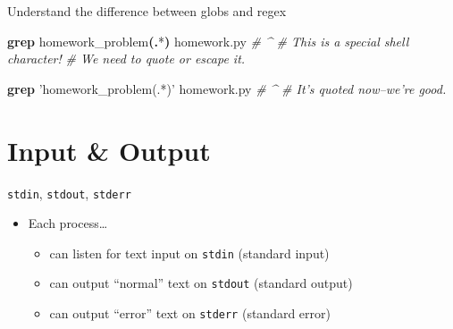 \documentclass[ignorenonframetext,]{beamer}
\newenvironment{Shaded}{}{}
\newcommand{\KeywordTok}[1]{\textcolor[rgb]{0.00,0.44,0.13}{\textbf{{#1}}}}
\newcommand{\StringTok}[1]{\textcolor[rgb]{0.25,0.44,0.63}{{#1}}}
\newcommand{\CommentTok}[1]{\textcolor[rgb]{0.38,0.63,0.69}{\textit{{#1}}}}
\newcommand{\NormalTok}[1]{{#1}}
\providecommand{\tightlist}{%
  \setlength{\itemsep}{0pt}\setlength{\parskip}{0pt}}
\begin{document}
\begin{frame}[fragile]{Understand the difference between globs and
regex}

\begin{Shaded}
\begin{Highlighting}[]
\KeywordTok{grep} \NormalTok{homework_problem}\KeywordTok{(.}\NormalTok{*}\KeywordTok{)} \NormalTok{homework.py}
\CommentTok{#                      ^}
\CommentTok{# This is a special shell character!}
\CommentTok{# We need to quote or escape it.}

\KeywordTok{grep} \StringTok{'homework_problem(.*)'} \NormalTok{homework.py}
\CommentTok{#                       ^}
\CommentTok{# It's quoted now--we're good.}
\end{Highlighting}
\end{Shaded}

\end{frame}

\section{Input \& Output}\label{input-output}

\begin{frame}[fragile]{\texttt{stdin}, \texttt{stdout}, \texttt{stderr}}

\begin{itemize}
\tightlist
\item
  Each process\ldots{}

  \begin{itemize}
  \tightlist
  \item
    can listen for text input on \texttt{stdin} (standard input)
  \item
    can output ``normal'' text on \texttt{stdout} (standard output)
  \item
    can output ``error'' text on \texttt{stderr} (standard error)
  \end{itemize}
\end{itemize}

\end{frame}
\end{document}
